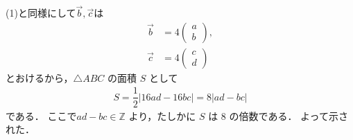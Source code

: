 \documentclass[../../main.tex]{subfiles}
\begin{document}
(1)と同様にして$\vec{b},\vec{c}$は
\begin{align}
  \vec{b} &= 4
  \begin{pmatrix} a \\ b
  \end{pmatrix}, \\
  \vec{c} &= 4
  \begin{pmatrix} c \\ d
  \end{pmatrix}
\end{align}
とおけるから，$\triangle ABC$ の面積 $S$ として
\begin{align}
  S = \dfrac{1}{2} | 16 ad - 16 bc | = 8 |ad - bc|
\end{align}
である．
ここで$ad - bc \in \mathbb{Z}$ より，たしかに $S$ は 8 の倍数である．
よって示された．

\newpage
\end{document}
